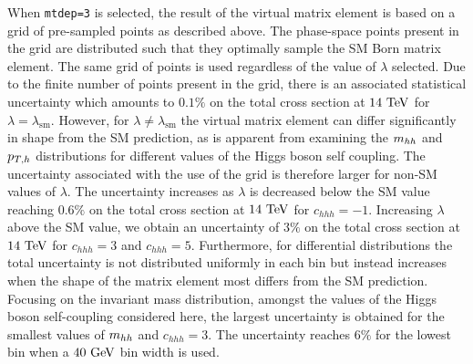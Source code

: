 When {\tt mtdep=3} is selected, the result of the virtual matrix element is based on a grid of pre-sampled points as described above. The phase-space points present in the grid are distributed such that they optimally sample the SM Born matrix element. The same grid of points is used regardless of the value of $\lambda$ selected. Due to the finite number of points present in the grid, there is an associated statistical uncertainty which amounts to $0.1\%$ on the total cross section at $14\ \TeV$ for $\lambda=\lambda_\mathrm{sm}$. However, for $\lambda \neq \lambda_\mathrm{sm}$ the virtual matrix element can differ significantly in shape from the SM prediction, as is apparent from examining the $m_{hh}$ and $p_{T,h}$ distributions for different values of the Higgs boson self coupling. The uncertainty associated with the use of the grid is therefore larger for non-SM values of $\lambda$. The uncertainty increases as $\lambda$ is decreased below the SM value reaching $0.6\%$ on the total cross section at $14\ \TeV$ for $c_{hhh} = -1$. Increasing $\lambda$ above the SM value, we obtain an uncertainty of $3\%$ on the total cross section at $14\ \TeV$ for $c_{hhh} = 3$ and  $c_{hhh} = 5$. Furthermore, for differential distributions the total uncertainty is not distributed uniformly in each bin but instead increases when the shape of the matrix element most differs from the SM prediction. Focusing on the invariant mass distribution, amongst the values of the Higgs boson self-coupling considered here, the largest uncertainty is obtained for the smallest values of $m_{hh}$ and $c_{hhh}=3$. The uncertainty reaches $6\%$ for the lowest bin when a $40\ \mathrm{GeV}$ bin width is used.
